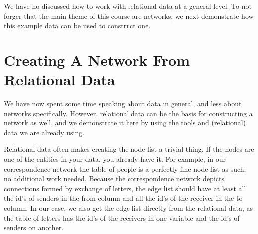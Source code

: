 \documentclass[
]{book}
\newenvironment{Shaded}{\begin{snugshade}}{\end{snugshade}}
\newcommand{\AttributeTok}[1]{\textcolor[rgb]{0.77,0.63,0.00}{#1}}
\newcommand{\ConstantTok}[1]{\textcolor[rgb]{0.00,0.00,0.00}{#1}}
\newcommand{\DecValTok}[1]{\textcolor[rgb]{0.00,0.00,0.81}{#1}}
\newcommand{\FunctionTok}[1]{\textcolor[rgb]{0.00,0.00,0.00}{#1}}
\newcommand{\NormalTok}[1]{#1}
\newcommand{\OtherTok}[1]{\textcolor[rgb]{0.56,0.35,0.01}{#1}}
\newcommand{\SpecialCharTok}[1]{\textcolor[rgb]{0.00,0.00,0.00}{#1}}
\newcommand{\StringTok}[1]{\textcolor[rgb]{0.31,0.60,0.02}{#1}}
\begin{document}
We have no discussed how to work with relational data at a general level. To not forger that the main theme of this course are
networks, we next demonstrate how this example data can be used to construct one.

\hypertarget{creating-a-network-from-relational-data}{%
\section{Creating A Network From Relational Data}\label{creating-a-network-from-relational-data}}

We have now spent some time speaking about data in general, and less about networks specifically. However, relational data
can be the basis for constructing a network as well, and we demonstrate it here by using the tools and (relational) data
we are already using.

Relational data often makes creating the node list a trivial thing. If the nodes are one of the entities in your data, you already
have it. For example, in our correspondence network the table of people is a perfectly fine node list as such, no additional work needed. Because the correspondence network depicts connections formed by exchange of letters, the edge list should have at least all the id's of senders in the from column and all the id's of the receiver in the to column. In our case, we also get the edge list directly from the relational data, as the table of letters has the id's of the receivers in one variable and the id's of senders on another.

\begin{Shaded}
\end{Shaded}
\end{document}
